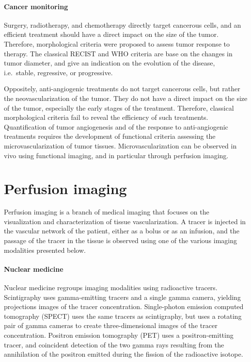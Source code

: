 \paragraph{Cancer monitoring}
Surgery, radiotherapy, and chemotherapy directly target cancerous cells, and an efficient treatment should have a direct impact on the size of the tumor.
Therefore, morphological criteria were proposed to assess tumor response to therapy.
The classical RECIST and WHO criteria are base on the changes in tumor diameter, and give an indication on the evolution of the disease, i.e.~stable, regressive, or progressive.

Oppositely, anti-angiogenic treatments do not target cancerous cells, but rather the neovascularization of the tumor.
They do not have a direct impact on the size of the tumor, especially the early stages of the treatment.
Therefore, classical morphological criteria fail to reveal the efficiency of such treatments.
Quantification of tumor angiogenesis and of the response to anti-angiogenic treatments requires the development of functional criteria assessing the microvascularization of tumor tissues.
Microvascularization can be observed in vivo using functional imaging, and in particular through perfusion imaging.

\section{Perfusion imaging}
\label{sec:IntroPerfusionImaging}
Perfusion imaging is a branch of medical imaging that focuses on the visualization and characterization of tissue vascularization.
A tracer is injected in the vascular network of the patient, either as a bolus or as an infusion, and the passage of the tracer in the tissue is observed using one of the various imaging modalities presented below.

\paragraph{Nuclear medicine}
\label{sec:IntroNM}
Nuclear medicine regroups imaging modalities using radioactive tracers. 
Scintigraphy uses gamma-emitting tracers and a single gamma camera, yielding projections images of the tracer concentration.
Single-photon emission computed tomography (SPECT) uses the same tracers as scintigraphy, but uses a rotating pair of gamma cameras to create three-dimensional images of the tracer concentration.
Positron emission tomography (PET) uses a positron-emitting tracer, and coincident detection of the two gamma rays resulting from the annihilation of the positron emitted during the fission of the radioactive isotope.

